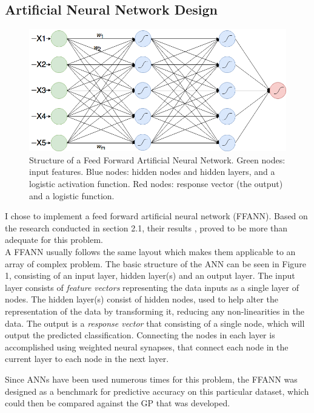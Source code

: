 \documentclass[11pt]{article}
\begin{document}
\subsection{Artificial Neural Network Design}
\begin{figure}[h]
\centering
\captionsetup{justification=centering}
\includegraphics[scale = .37]{ANN}%
\caption{Structure of a Feed Forward Artificial Neural Network. Green nodes: input features. Blue nodes: hidden nodes and hidden layers, and a logistic activation function. Red nodes: response vector (the output) and a logistic function.} 
\end{figure}
I chose to implement a feed forward artificial neural network (FFANN). Based on the research conducted in section 2.1, their results \cite{?}, proved to be more than adequate for this problem.\\
A FFANN usually follows the same layout which makes them applicable to an array of complex problem. The basic structure of the ANN can be seen in Figure 1, consisting of an input layer, hidden layer(s) and an output layer. The input layer consists of \textit{feature vectors} representing the data inputs as a single layer of nodes. The hidden layer(s) consist of hidden nodes, used to help alter the representation of the data by transforming it, reducing any non-linearities in the data. The output is a \textit{response vector} that consisting of a single node, which will output the predicted classification. Connecting the nodes in each layer is accomplished using weighted neural synapses, that connect each node in the current layer to each node in the next layer. 

Since ANNs have been used numerous times for this problem, the FFANN was designed as a benchmark for predictive accuracy on this particular dataset, which could then be compared against the GP that was developed. 
\end{document}
